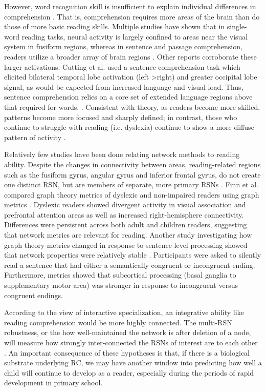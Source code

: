 However, word recognition skill is insufficient to explain individual differences in comprehension \citep{Gough1986, Hoover1990}. That is, comprehension requires more areas of the brain than do those of more basic reading skills. Multiple studies have shown that in single-word reading tasks, neural activity is largely confined to areas near the visual system in fusiform regions, whereas in sentence and passage comprehension, readers utilize a broader array of brain regions \citep{Rimrodt2008,Xu2005}. Other reports corroborate these larger activations: Cutting et al. used a sentence comprehension task which elicited bilateral temporal lobe activation (left \textgreater right) and greater occipital lobe signal, as would be expected from increased language and visual load. Thus, sentence comprehension relies on a core set of extended language regions above that required for words.  \citep{Cutting2006a}. Consistent with theory, as readers become more skilled, patterns become more focused and sharply defined; in contrast, those who continue to struggle with reading (i.e. dyslexia) continue to show a more diffuse pattern of activity \citep{Rimrodt2009}. 

Relatively few studies have been done relating network methods to reading ability. Despite the changes in connectivity between areas, reading-related regions such as the fusiform gyrus, angular gyrus and inferior frontal gyrus, do not create one distinct RSN, but are members of separate, more primary RSNs \citep{Vogel2013}. Finn et al. compared graph theory metrics of dyslexic and non-impaired readers using graph metrics \citep{Finn2014}. Dyslexic readers showed divergent activity in visual association and prefrontal attention areas as well as increased right-hemisphere connectivity. Differences were persistent across both adult and children readers, suggesting that network metrics are relevant for reading. Another study investigating how graph theory metrics changed in response to sentence-level processing showed that network properties were relatively stable \citep{Ye2012}. Participants were asked to silently read a sentence that had either a semantically congruent or incongruent ending. Furthermore, metrics showed that subcortical processing (basal ganglia to supplementary motor area) was stronger in response to incongruent versus congruent endings. 

According to the view of interactive specialization, an integrative ability like reading comprehension would be more highly connected. The multi-RSN robustness, or the how well-maintained the network is after deletion of a node, will measure how strongly inter-connected the RSNs of interest are to each other \citep{Bullmore2009}. An important consequence of these hypotheses is that, if there is a biological substrate underlying RC, we may have another window into predicting how well a child will continue to develop as a reader, especially during the periods of rapid development in primary school.


